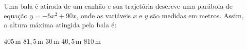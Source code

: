 Uma bala é atirada de um canhão e sua trajetória descreve uma parábola de equação $y=-5x^2+90x$, onde as variáveis $x$ e $y$ são medidas em metros. Assim, a altura máxima atingida pela bala é:

\parbox{0.33\linewidth}{

$405$\,m
$81{,}5$\,m
$30$\,m
$40{,}5$\,m
$810$\,m

}\parbox{0.66\linewidth}{
}


